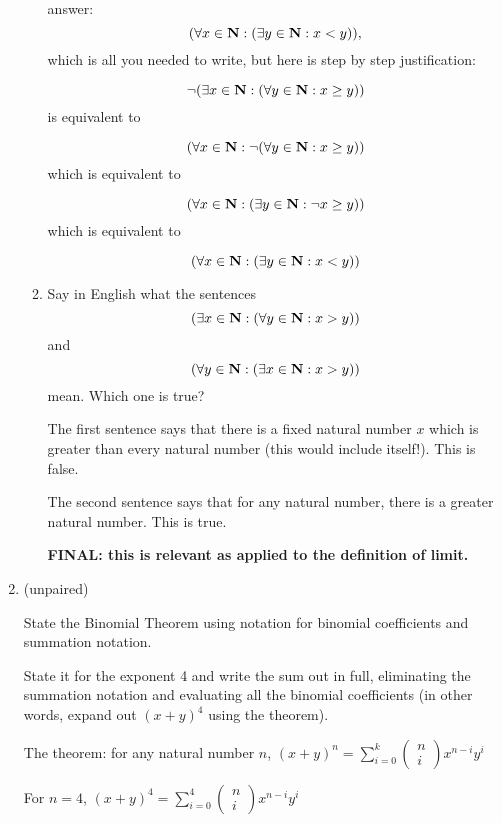\documentclass[12pt]{article}
\begin{document}
\begin{enumerate}
\begin{enumerate}
answer:  $$(\forall x \in {\bf N}:(\exists y \in {\bf N}: x < y)),$$
which is all you needed to write, but here is step by step justification:

$$\neg (\exists x \in {\bf N}:(\forall y \in {\bf N}: x \geq y))$$ is equivalent to

$$(\forall x \in {\bf N}:\neg (\forall y \in {\bf N}: x \geq y))$$ which is equivalent to

$$(\forall x \in {\bf N}:(\exists y \in {\bf N}: \neg x \geq y))$$ which is equivalent to

$$(\forall x \in {\bf N}:(\exists y \in {\bf N}: x < y))$$

\item  Say in English what the sentences  $$(\exists x \in {\bf N}:(\forall y \in {\bf N}: x >  y))$$  and $$(\forall y \in {\bf N}:(\exists x \in {\bf N}: x >  y))$$ mean.  Which one is true?

The first sentence says that there is a fixed natural number $x$ which is greater than every natural number (this would include itself!).  This is false.

The second sentence says that for any natural number, there is a greater natural number.  This is true.

{\bf FINAL:  this is relevant as applied to the definition of limit.}


\end{enumerate}



\item  (unpaired) 

 State the Binomial Theorem using notation for binomial coefficients and summation notation.

State it for the exponent 4 and write the sum out in full, eliminating the summation notation and evaluating all the binomial coefficients (in other words, expand out $(x+y)^4$ using the theorem).

The theorem:  for any natural number $n$, $(x+y)^n = \sum_{i=0}^k \left(\begin{array}{c} n \\ i \end{array}\right)x^{n-i}y^i$

For $n=4$,  $(x+y)^4 = \sum_{i=0}^4 \left(\begin{array}{c} n \\ i \end{array}\right)x^{n-i}y^i$


\end{enumerate}
\end{document}
